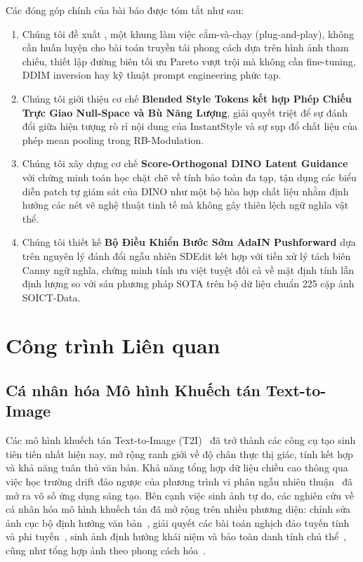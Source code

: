 \documentclass[runningheads]{llncs}
\begin{document}
Các đóng góp chính của bài báo được tóm tắt như sau:
\begin{enumerate}
    \item Chúng tôi đề xuất \textbf{\method}, một khung làm việc cắm-và-chạy (plug-and-play), không cần huấn luyện cho bài toán truyền tải phong cách dựa trên hình ảnh tham chiếu, thiết lập đường biên tối ưu Pareto vượt trội mà không cần fine-tuning, DDIM inversion hay kỹ thuật prompt engineering phức tạp.
    \item Chúng tôi giới thiệu cơ chế \textbf{Blended Style Tokens kết hợp Phép Chiếu Trực Giao Null-Space và Bù Năng Lượng}, giải quyết triệt để sự đánh đổi giữa hiện tượng rò rỉ nội dung của InstantStyle và sự sụp đổ chất liệu của phép mean pooling trong RB-Modulation.
    \item Chúng tôi xây dựng cơ chế \textbf{Score-Orthogonal DINO Latent Guidance} với chứng minh toán học chặt chẽ về tính bảo toàn đa tạp, tận dụng các biểu diễn patch tự giám sát của DINO như một bộ hòa hợp chất liệu nhằm định hướng các nét vẽ nghệ thuật tinh tế mà không gây thiên lệch ngữ nghĩa vật thể.
    \item Chúng tôi thiết kế \textbf{Bộ Điều Khiển Bước Sớm AdaIN Pushforward} dựa trên nguyên lý đánh đổi ngẫu nhiên SDEdit kết hợp với tiền xử lý tách biên Canny ngữ nghĩa, chứng minh tính ưu việt tuyệt đối cả về mặt định tính lẫn định lượng so với sáu phương pháp SOTA trên bộ dữ liệu chuẩn 225 cặp ảnh SOICT-Data.
\end{enumerate}

\section{Công trình Liên quan}
\label{sec:related}

\subsection{Cá nhân hóa Mô hình Khuếch tán Text-to-Image}
Các mô hình khuếch tán Text-to-Image (T2I)~\cite{ddpm,sd,wuerstchen} đã trở thành các công cụ tạo sinh tiên tiến nhất hiện nay, mở rộng ranh giới về độ chân thực thị giác, tính kết hợp và khả năng tuân thủ văn bản. Khả năng tổng hợp dữ liệu chiều cao thông qua việc học trường drift đảo ngược của phương trình vi phân ngẫu nhiên thuận~\cite{songscore} đã mở ra vô số ứng dụng sáng tạo. Bên cạnh việc sinh ảnh tự do, các nghiên cứu về cá nhân hóa mô hình khuếch tán đã mở rộng trên nhiều phương diện: chỉnh sửa ảnh cục bộ định hướng văn bản~\cite{prompt2prompt,instructpix2pix}, giải quyết các bài toán nghịch đảo tuyến tính và phi tuyến~\cite{dps}, sinh ảnh định hướng khái niệm và bảo toàn danh tính chủ thể~\cite{dreambooth,lora}, cũng như tổng hợp ảnh theo phong cách hóa~\cite{stylealigned,instantstyle,rout2025rbmodulation}.
\end{document}
